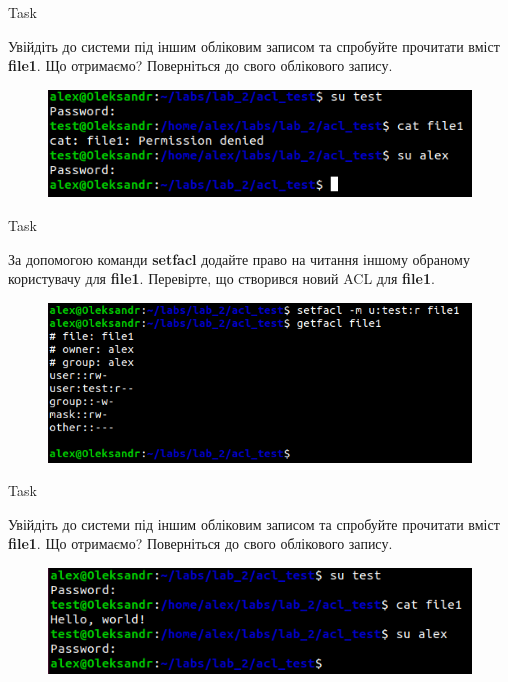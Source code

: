 \documentclass[a4paper,12pt]{article}
\newcommand{\RomanNumeralCaps}[1]{\MakeUppercase{\romannumeral #1}}
\begin{document}
\newpage
    \begin{center}
        \Large{Task \RomanNumeralCaps{18}}
    \end{center}
    Увійдіть до системи під іншим обліковим записом та спробуйте прочитати вміст \textbf{file1}. Що отримаємо? Поверніться до свого облікового запису.
    \begin{figure}[h!]
        \begin{minipage}[h]{1\linewidth}
            \centering
            \includegraphics[width=0.6\linewidth]{Prt sc/Figure_18.png}  
        \end{minipage}
    \end{figure}

    \begin{center}
        \Large{Task \RomanNumeralCaps{19}}
    \end{center}
    За допомогою команди \textbf{setfacl} додайте право на читання іншому обраному користувачу для \textbf{file1}. Перевірте, що створився новий ACL для \textbf{file1}.
    \begin{figure}[h!]
        \begin{minipage}[h]{1\linewidth}
            \centering
            \includegraphics[width=0.6\linewidth]{Prt sc/Figure_19.png}  
    
        \end{minipage}
    \end{figure}

    \begin{center}
        \Large{Task \RomanNumeralCaps{20}}
    \end{center}
    Увійдіть до системи під іншим обліковим записом та спробуйте прочитати вміст \textbf{file1}. Що отримаємо? Поверніться до свого облікового запису.
    \begin{figure}[h!]
        \begin{minipage}[h]{1\linewidth}
            \centering
            \includegraphics[width=0.6\linewidth]{Prt sc/Figure_20.png}  
        \end{minipage}
    \end{figure}
\end{document}
